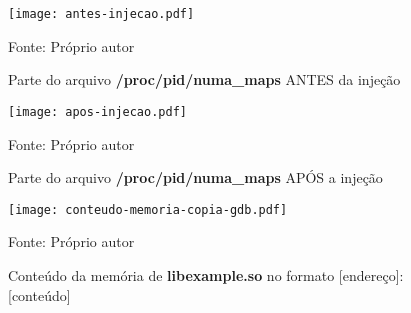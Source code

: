 \begin{figure}[htb!]
\footnotesize
\caption{Parte do arquivo \textbf{/proc/pid/numa\_maps} ANTES da injeção }
\texttt{[image: antes-injecao.pdf]}
\centering
\label{fig:antes-injecao}
\begin{center}
Fonte: Próprio autor 
\end{center}
\end{figure}


\begin{figure}[htb!]
\footnotesize
\caption{Parte do arquivo \textbf{/proc/pid/numa\_maps} APÓS a injeção }
\texttt{[image: apos-injecao.pdf]}
\centering
\label{fig:apos-injecao}
\begin{center}
Fonte: Próprio autor 
\end{center}
\end{figure}

%
%
%
%

%
%
%

\begin{figure}[htb!]
\footnotesize
\caption{Conteúdo da memória de \textbf{libexample.so} no formato [endereço]: [conteúdo]}
\texttt{[image: conteudo-memoria-copia-gdb.pdf]}
\centering
\label{fig:conteudo-memoria-copia-gdb}
\begin{center}
Fonte: Próprio autor 
\end{center}
\end{figure}


